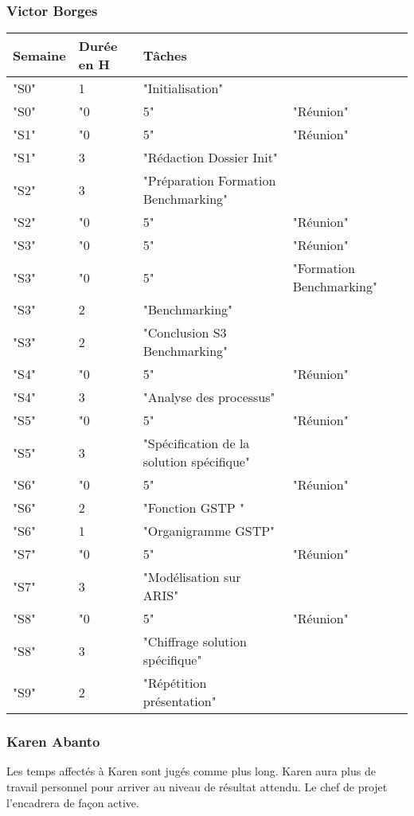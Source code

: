 \documentclass[twoside]{article}
\begin{document}
\vfill
\pagebreak

\subsubsection{Victor Borges}
\begin{tabular}{|l|l|l|l|}
\hline
Semaine&Durée en H&Tâches\\
\hline
"S0"&1&"Initialisation"&\\
\hline
"S0"&"0&5"&"Réunion"\\
\hline
"S1"&"0&5"&"Réunion"\\
\hline
"S1"&3&"Rédaction Dossier Init"&\\
\hline
"S2"&3&"Préparation Formation Benchmarking"&\\
\hline
"S2"&"0&5"&"Réunion"\\
\hline
"S3"&"0&5"&"Réunion"\\
\hline
"S3"&"0&5"&"Formation Benchmarking"\\
\hline
"S3"&2&"Benchmarking"&\\
\hline
"S3"&2&"Conclusion S3 Benchmarking"&\\
\hline
"S4"&"0&5"&"Réunion"\\
\hline
"S4"&3&"Analyse des processus"&\\
\hline
"S5"&"0&5"&"Réunion"\\
\hline
"S5"&3&"Spécification de la solution spécifique"&\\
\hline
"S6"&"0&5"&"Réunion"\\
\hline
"S6"&2&"Fonction GSTP "&\\
\hline
"S6"&1&"Organigramme GSTP"&\\
\hline
"S7"&"0&5"&"Réunion"\\
\hline
"S7"&3&"Modélisation sur ARIS"&\\
\hline
"S8"&"0&5"&"Réunion"\\
\hline
"S8"&3&"Chiffrage solution spécifique"&\\
\hline
"S9"&2&"Répétition présentation"&\\
\hline
\end{tabular}
\vfill

\pagebreak
\subsubsection{Karen Abanto}

Les temps affectés à Karen sont jugés comme plus long. Karen aura plus de travail
personnel pour arriver au niveau de résultat attendu. 
Le chef de projet l'encadrera de façon active.
\end{document}
